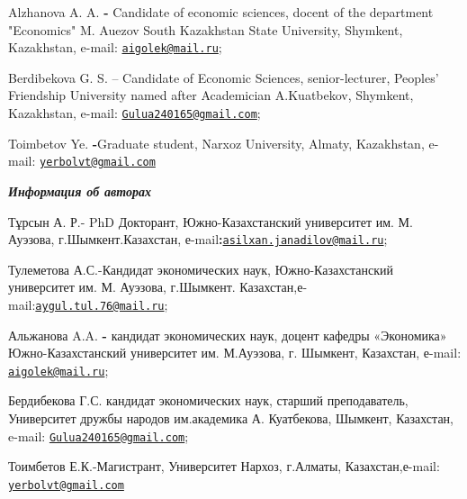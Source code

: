Alzhanova A. A. {\bfseries -} Candidate of economic sciences, docent of the
department "Economics" M. Auezov South Kazakhstan State University,
Shymkent, Kazakhstan, e-mail:
\href{mailto:aigolek@mail.ru}{\nolinkurl{aigolek@mail.ru}};

Berdibekova G. S. -- Candidate of Economic Sciences, senior-lecturer,
Peoples'{} Friendship University named after Academician
A.Kuatbekov, Shymkent, Kazakhstan, e-mail:
\href{mailto:Gulua240165@gmail.com}{\nolinkurl{Gulua240165@gmail.com}};

Toimbetov Ye. {\bfseries -}Graduate student, Narxoz University, Almaty,
Kazakhstan, e-mail:
\href{mailto:yerbolvt@gmail.com}{\nolinkurl{yerbolvt@gmail.com}}

\emph{{\bfseries Информация об авторах}}

Тұрсын А. Р.- PhD Докторант, Южно-Казахстанский университет им. М.
Ауэзова, г.Шымкент.Казахстан,
е-mail{\bfseries :}\href{mailto:asilxan.janadilov@mail.ru}{\nolinkurl{asilxan.janadilov@mail.ru}};

Тулеметова А.С.-Кандидат экономических наук, Южно-Казахстанский
университет им. М. Ауэзова, г.Шымкент.
Казахстан,е-mail:\href{mailto:aygul.tul.76@mail.ru}{\nolinkurl{aygul.tul.76@mail.ru}};

Альжанова A.A. {\bfseries -} кандидат экономических наук, доцент кафедры
«Экономика» Южно-Казахстанский университет им. М.Ауэзова, г. Шымкент,
Казахстан, е-mail:
\href{mailto:aigolek@mail.ru}{\nolinkurl{aigolek@mail.ru}};

Бердибекова Г.С. кандидат экономических наук, старший преподаватель,
Университет дружбы народов им.академика А. Куатбекова, Шымкент,
Казахстан, e-mail:
\href{mailto:Gulua240165@gmail.com}{\nolinkurl{Gulua240165@gmail.com}};

Тоимбетов Е.К.-Магистрант, Университет Нархоз, г.Алматы,
Казахстан,е-mail:
\href{mailto:yerbolvt@gmail.com}{\nolinkurl{yerbolvt@gmail.com}}
